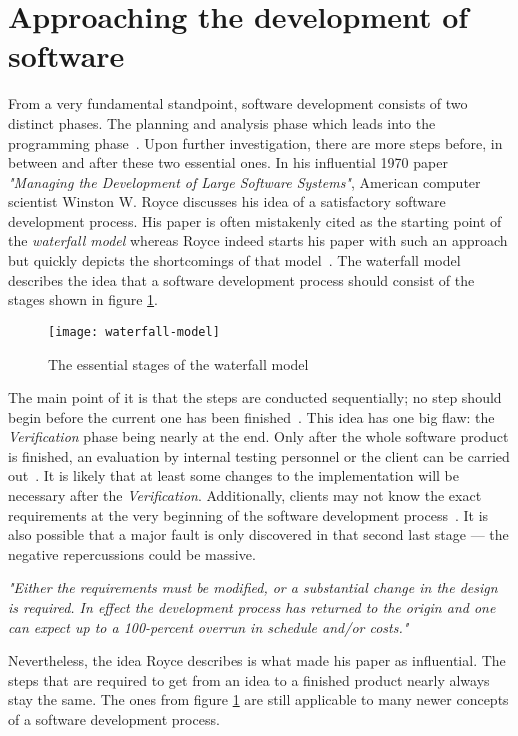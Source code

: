 \documentclass[12pt,a4paper]{report}
\begin{document}
\section{Approaching the development of software} \label{sect:software-development-process}

From a very fundamental standpoint, software development consists of two distinct phases.
The planning and analysis phase which leads into the programming phase~\cite{royce-large-systems}.
Upon further investigation, there are more steps before, in between and after these two essential ones.
In his influential 1970 paper \textit{"Managing the Development of Large Software Systems"},
American computer scientist Winston W. Royce discusses his idea of a satisfactory
software development process. His paper is often mistakenly cited as the starting point
of the \textit{waterfall model} whereas Royce indeed starts his paper with such an approach but quickly
depicts the shortcomings of that model~\cite{royce-large-systems, larman-iid-history}.
The waterfall model describes the idea that a software development process should consist of
the stages shown in figure \ref{fig:waterfall-model}.
\begin{figure}[htbp]
\centering
\texttt{[image: waterfall-model]}
\caption{The essential stages of the waterfall model}
\label{fig:waterfall-model}
\end{figure}
The main point of it is that the steps are conducted sequentially;
no step should begin before the current one has been finished~\cite{boehm-spiral}.
This idea has one big flaw: the \textit{Verification} phase being nearly at the end.
Only after the whole software product is finished, an evaluation by internal testing personnel or
the client can be carried out~\cite{royce-large-systems}.
It is likely that at least some changes to the implementation will be necessary after the \textit{Verification}.
Additionally, clients may not know the exact requirements at the very beginning
of the software development process~\cite{parnas-rational-design-process}.
It is also possible that a major fault is only discovered in that second last stage ---
the negative repercussions could be massive.
\begin{displayquote}
\emph{"Either the requirements must be modified, or a substantial change
in the design is required. In effect the development process has returned to
the origin and one can expect up to a 100-percent overrun
in schedule and/or costs."}~\cite{royce-large-systems}
\end{displayquote}
Nevertheless, the idea Royce describes is what made his paper as influential.
The steps that are required to get from an idea to a finished product nearly always
stay the same. The ones from figure \ref{fig:waterfall-model} are still applicable to
many newer concepts of a software development process.
\end{document}
